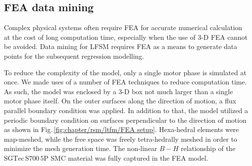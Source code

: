         \subsection{\acs{FEA} data mining}          \label{Chapter:RSM/LTFM/data mining}
        
        
            Complex physical systems often require \acs{FEA} for accurate numerical calculation at the cost of long computation time, especially when the use of 3-D \acs{FEA} cannot be avoided. Data mining for \acs{LFSM} requires FEA as a means to generate data points for the subsequent regression modelling. 
            
            
            To reduce the complexity of the model, only a single motor phase is simulated at once. We made uses of a number of \acs{FEA} techniques to reduce computation time. As such, the model was enclosed by a 3-D box not much larger than a single motor phase itself. On the outer surfaces along the direction of motion, a flux parallel boundary condition was applied. In addition to that, the model utilized a periodic boundary condition on surfaces perpendicular to the direction of motion as shown in Fig.\,\ref{fig:chapter/rsm/ltfm/FEA setup}. Hexa-hedral elements were map-meshed, while the free space was freely tetra-hedrally meshed in order to minimize the mesh generation time. The non-linear $B-H$ relationship of the $\mathrm{SGTec\,S700\,5P}$ \acs{SMC} material was fully captured in the \acs{FEA} model. 
            
